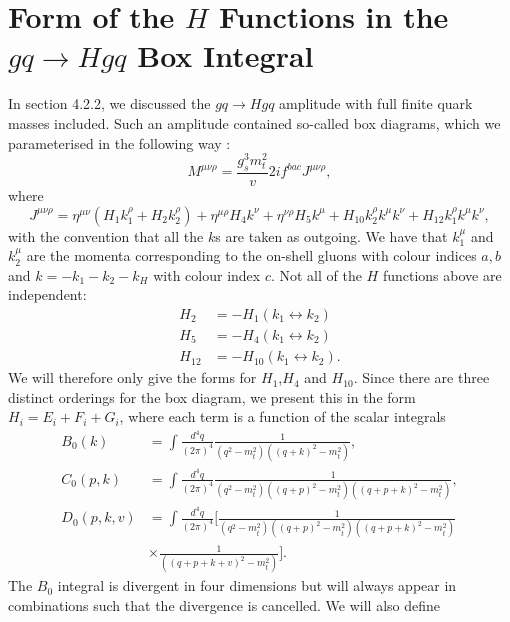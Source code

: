 \chapter{Form of the $H$ Functions in the $gq \to Hgq$ Box Integral}
\label{app:boxfunc}

In section 4.2.2, we discussed the $gq \to Hgq$ amplitude with full finite quark masses included. Such an amplitude contained so-called box diagrams, which we parameterised in the following way \cite{Duca2003}:
\begin{equation}
M^{\mu \nu \rho} = \frac{g_s^3 m_t^2}{v} 2i f^{bac}J^{\mu \nu \rho},
\end{equation}
where
\begin{equation}
J^{\mu \nu \rho} = \eta^{\mu \nu}(H_1 k_1^\rho + H_2 k_2^\rho) + \eta^{\mu \rho}H_4 k^\nu + \eta^{\nu \rho}H_5 k^\mu + H_{10}k_2^\rho k^\mu k^\nu + H_{12}k_1^\rho k^\mu k^\nu,
\end{equation}
with the convention that all the $k$s are taken as outgoing. We have that $k_1^\mu$ and $k_2^\mu$ are the momenta corresponding to the on-shell gluons with colour indices $a,b$ and $k = -k_1 -k_2 -k_H$ with colour index $c$. Not all of the $H$ functions above are independent:
\begin{equation}
\begin{split}
H_2 &= -H_1(k_1 \leftrightarrow k_2) \\
H_5 &= -H_4(k_1 \leftrightarrow k_2) \\
H_{12} &= -H_{10}(k_1 \leftrightarrow k_2).
\end{split}
\end{equation}
We will therefore only give the forms for $H_1$,$H_4$ and $H_{10}$. Since there are three distinct orderings for the box diagram, we present this in the form $H_i = E_i + F_i + G_i$, where each term is a function of the scalar integrals
\begin{equation}
\begin{split}
B_0(k) &= \int \frac{d^4 q}{(2 \pi)^4} \frac{1}{(q^2-m_t^2)((q+k)^2-m_t^2)}, \\
C_0(p,k) &= \int \frac{d^4 q}{(2 \pi)^4} \frac{1}{(q^2-m_t^2)((q+p)^2-m_t^2)((q+p+k)^2-m_t^2)}, \\
D_0(p,k,v) &= \int \frac{d^4 q}{(2 \pi)^4} \biggl[ \frac{1}{(q^2-m_t^2)((q+p)^2-m_t^2)((q+p+k)^2-m_t^2)} \\
& \times \frac{1}{((q+p+k+v)^2-m_t^2)} \biggr].
\end{split}
\end{equation}
The $B_0$ integral is divergent in four dimensions but will always appear in combinations such that the divergence is cancelled. We will also define
